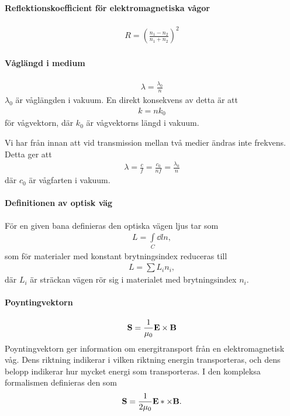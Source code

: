 \paragraph{Reflektionskoefficient för elektromagnetiska vågor}
\begin{align*}
	R = \left(\frac{n_1 - n_2}{n_1 + n_2}\right)^2
\end{align*}

\paragraph{Våglängd i medium}
\begin{align*}
	\lambda = \frac{\lambda_0}{n}
\end{align*}
$\lambda_0$ är våglängden i vakuum. En direkt konsekvens av detta är att
\begin{align*}
	k = nk_0
\end{align*}
för vågvektorn, där $k_0$ är vågvektorns längd i vakuum.

\deriv
Vi har från innan att vid transmission mellan två medier ändras inte frekvens. Detta ger att
\begin{align*}
	\lambda = \frac{c}{f} = \frac{c_0}{nf} = \frac{\lambda_0}{n}
\end{align*}
där $c_0$ är vågfarten i vakuum.

\paragraph{Definitionen av optisk väg}
För en given bana definieras den optiska vägen ljus tar som
\begin{align*}
	L = \int\limits_{C}\dd{l}n,
\end{align*}
som för materialer med konstant brytningsindex reduceras till
\begin{align*}
	L = \sum L_in_i,
\end{align*}
där $L_i$ är sträckan vägen rör sig i materialet med brytningsindex $n_i$.

\paragraph{Poyntingvektorn}
\begin{align*}
	\vect{S} = \frac{1}{\mu_0}\vect{E}\times\vect{B}
\end{align*}
Poyntingvektorn ger information om energitransport från en elektromagnetisk våg. Dens riktning indikerar i vilken riktning energin transporteras, och dens belopp indikerar hur mycket energi som transporteras. I den kompleksa formalismen definieras den som
\begin{align*}
	\vect{S} = \frac{1}{2\mu_0}\vect{E}*\times\vect{B}.
\end{align*}


